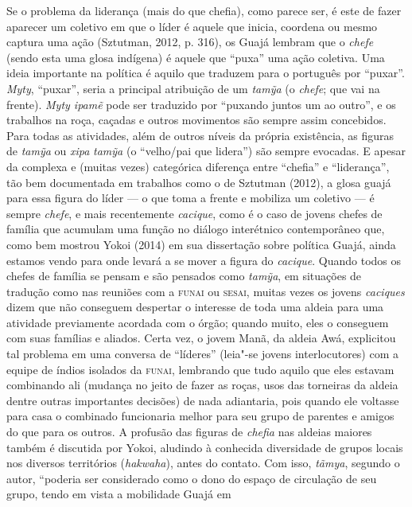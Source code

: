 Se o problema da liderança (mais do que chefia), como parece ser, é este
de fazer aparecer um coletivo em que o líder é aquele que inicia,
coordena ou mesmo captura uma ação (Sztutman, 2012, p. 316), os Guajá
lembram que o \emph{chefe} (sendo esta uma glosa indígena) é aquele que
``puxa'' uma ação coletiva. Uma ideia importante na política é aquilo
que traduzem para o português por ``puxar''. \emph{Myty}, ``puxar'',
seria a principal atribuição de um \emph{tamỹa} (o \emph{chefe}; que vai
na frente). \emph{Myty ipamẽ} pode ser traduzido por ``puxando juntos um
ao outro'', e os trabalhos na roça, caçadas e outros movimentos são
sempre assim concebidos. Para todas as atividades, além de outros níveis
da própria existência, as figuras de \emph{tamỹa} ou \emph{xipa}
\emph{tamỹa} (o ``velho/pai que lidera'') são sempre evocadas. E apesar
da complexa e (muitas vezes) categórica diferença entre ``chefia'' e
``liderança'', tão bem documentada em trabalhos como o de Sztutman
(2012), a glosa guajá para essa figura do líder --- o que toma a frente e
mobiliza um coletivo --- é sempre \emph{chefe}, e mais recentemente
\emph{cacique}, como é o caso de jovens chefes de família que acumulam
uma função no diálogo interétnico contemporâneo que, como bem mostrou
Yokoi (2014) em sua dissertação sobre política Guajá, ainda estamos
vendo para onde levará a se mover a figura do \emph{cacique}. Quando
todos os chefes de família se pensam e são pensados como \emph{tamỹa},
em situações de tradução como nas reuniões com a \textsc{funai} ou \textsc{sesai}, muitas
vezes os jovens \emph{caciques} dizem que não conseguem despertar o
interesse de toda uma aldeia para uma atividade previamente acordada com
o órgão; quando muito, eles o conseguem com suas famílias e aliados.
Certa vez, o jovem Manã, da aldeia Awá, explicitou tal problema
em uma conversa de ``líderes'' (leia"-se jovens interlocutores) com a
equipe de índios isolados da \textsc{funai}, lembrando que tudo aquilo que eles
estavam combinando ali (mudança no jeito de fazer as roças, usos das
torneiras da aldeia dentre outras importantes decisões) de nada
adiantaria, pois quando ele voltasse para casa o combinado funcionaria
melhor para seu grupo de parentes e amigos do que para os outros. A
profusão das figuras de \emph{chefia} nas aldeias maiores também é
discutida por Yokoi, aludindo à conhecida diversidade de grupos locais
nos diversos territórios (\emph{hakwaha}), antes do contato. Com isso,
\emph{tãmya}, segundo o autor, ``poderia ser considerado como o dono do
espaço de circulação de seu grupo, tendo em vista a mobilidade Guajá em
